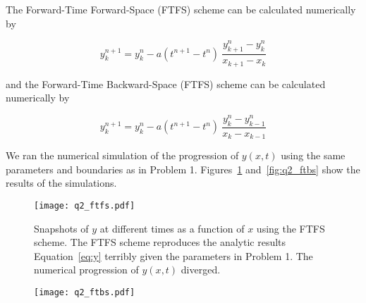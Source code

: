 \documentclass{article}
\begin{document}
\begin{homeworkProblem}

    The Forward-Time Forward-Space (FTFS) scheme can be calculated numerically
    by 

    \begin{equation}
        y^{n+1}_k = y^n_k - a(t^{n+1} - t^n)  \
        \frac{y^n_{k+1} - y^n_k}{x_{k+1} - x_k}
    \end{equation}

    \noindent and the Forward-Time Backward-Space (FTFS) scheme can be
    calculated numerically by 

    \begin{equation}
        y^{n+1}_k = y^n_k - a(t^{n+1} - t^n)  \
        \frac{y^n_{k} - y^n_{k-1}}{x_{k} - x_{k-1}}
    \end{equation}

    We ran the numerical simulation of the progression of $y(x,t)$ using the
    same parameters and boundaries as in Problem 1.  Figures~\ref{fig:q2_ftfs}
    and~\ref{fig:q2_ftbs} show the results of the simulations.

    \begin{figure}[!ht]
    \begin{center}
        \texttt{[image: q2\_ftfs.pdf]} %

        \caption{\label{fig:q2_ftfs} Snapshots of $y$ at different times as a
        function of $x$ using the FTFS scheme. The FTFS scheme reproduces the
        analytic results Equation~\ref{eq:y} terribly given the parameters in
        Problem 1. The numerical progression of $y(x,t)$
        diverged.}

    \end{center}
    \end{figure}
    
    \begin{figure}[!ht]
    \begin{center}
        \texttt{[image: q2\_ftbs.pdf]} %


\end{center}
\end{figure}
\end{homeworkProblem}
\end{document}

